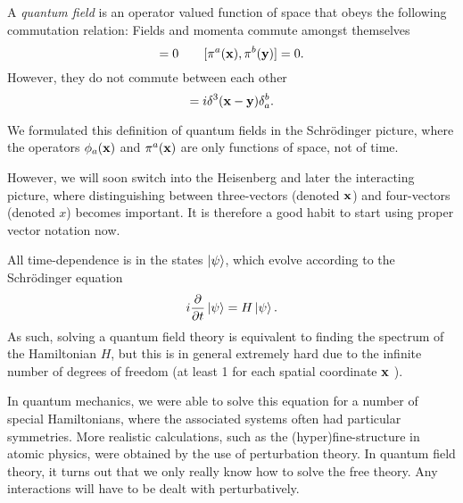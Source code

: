 \begin{definition}
  A \emph{quantum field} is an operator valued function of space that obeys the following commutation relation:
  Fields and momenta commute amongst themselves
  \begin{equation}
    [\phi_a(\vb{x}), \phi_b(\vb{y})] = 0 \qquad
    [\pi^a(\vb{x}), \pi^b(\vb{y})] = 0.
  \end{equation}
  However, they do not commute between each other
  \begin{equation}
    [\phi_a(\vb{x}), \pi^b(\vb{y})] = i \delta^3(\vb{x} - \vb{y}) \delta_a^b.
  \end{equation}
\end{definition}

We formulated this definition of quantum fields in the Schrödinger picture, where the operators $\phi_a(\vb{x})$ and $\pi^a(\vb{x})$ are only functions of space, not of time.
\begin{leftbar}
  \begin{notation}
  However, we will soon switch into the Heisenberg and later the interacting picture, where distinguishing between three-vectors (denoted $\vb{x}$) and four-vectors (denoted $x$) becomes important. It is therefore a good habit to start using proper vector notation now.
  \end{notation}
\end{leftbar}
All time-dependence is in the states $\ket{\psi}$, which evolve according to the Schrödinger equation
\begin{equation}
  i \pdv{}{t} \ket{\psi} = H \ket{\psi}.
\end{equation}
As such, solving a quantum field theory is equivalent to finding the spectrum of the Hamiltonian $H$, but this is in general extremely hard due to the infinite number of degrees of freedom (at least 1 for each spatial coordinate $\vb{x}$ ).

\begin{leftbar}
  \begin{remark}
    In quantum mechanics, we were able to solve this equation for a number of special Hamiltonians, where the associated systems often had particular symmetries. More realistic calculations, such as the (hyper)fine-structure in atomic physics, were obtained by the use of perturbation theory.
    In quantum field theory, it turns out that we only really know how to solve the free theory. Any interactions will have to be dealt with perturbatively.
  \end{remark}
\end{leftbar}

